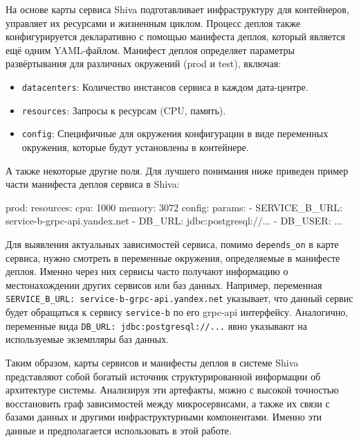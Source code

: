 На основе карты сервиса Shiva подготавливает инфраструктуру для контейнеров, управляет их ресурсами и жизненным циклом. Процесс деплоя также конфигурируется декларативно с помощью манифеста деплоя, который является ещё одним YAML-файлом. Манифест деплоя определяет параметры развёртывания для различных окружений (prod и test), включая:

\begin{itemize}
    \item \verb|datacenters|: Количество инстансов сервиса в каждом дата-центре.
    \item \verb|resources|: Запросы к ресурсам (CPU, память).
    \item \verb|config|: Специфичные для окружения конфигурации в виде переменных окружения, которые будут установлены в контейнере.
\end{itemize}

А также некоторые другие поля. Для лучшего понимания ниже приведен пример части манифеста деплоя сервиса в Shiva:

\begin{nocode}
prod:
  resources:
    cpu: 1000
    memory: 3072
  config:
    params:
      - SERVICE_B_URL: service-b-grpc-api.yandex.net
      - DB_URL: jdbc:postgresql://...
      - DB_USER: ...
\end{nocode}


Для выявления актуальных зависимостей сервиса, помимо \verb|depends_on| в карте сервиса, нужно смотреть в переменные окружения, определяемые в манифесте деплоя. Именно через них сервисы часто получают информацию о местонахождении других сервисов или баз данных. Например, переменная \verb|SERVICE_B_URL: service-b-grpc-api.yandex.net| указывает, что данный сервис будет обращаться к сервису \verb|service-b| по его grpc-api интерфейсу. Аналогично, переменные вида \verb|DB_URL: jdbc:postgresql://...| явно указывают на используемые экземпляры баз данных.

Таким образом, карты сервисов и манифесты деплоя в системе Shiva представляют собой богатый источник структурированной информации об архитектуре системы. Анализируя эти артефакты, можно с высокой точностью восстановить граф зависимостей между микросервисами, а также их связи с базами данных и другими инфраструктурными компонентами. Именно эти данные и предполагается использовать в этой работе. 

